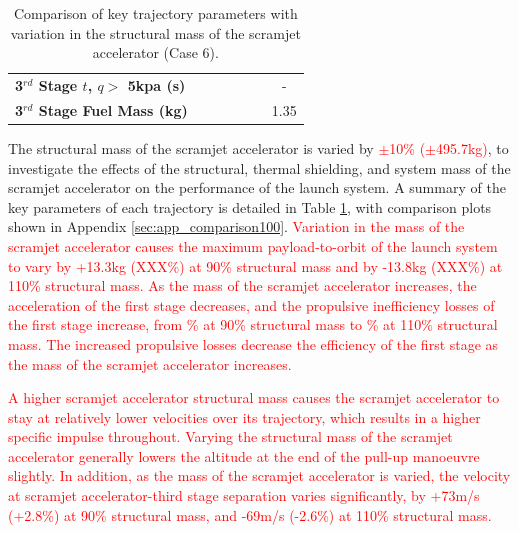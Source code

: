 \begin{table}[ht]
\begin{tabular}{l c c c c c c}
		\\
		\textbf{3$^{rd}$ Stage $t$, $q >$ 5kpa (s)}
		& \thirdqOverFivemSPARTANNinetyNoReturn
		& \thirdqOverFivemSPARTANNinetyFiveNoReturn
		& \thirdqOverFivemSPARTANStandardNoReturn
		& \thirdqOverFivemSPARTANOneHundredFiveNoReturn
		& \thirdqOverFivemSPARTANOneHundredTenNoReturn
		& -
		\\
		\textbf{3$^{rd}$ Stage Fuel Mass (kg)}
		& \thirdmFuelmSPARTANNinetyNoReturn
		& \thirdmFuelmSPARTANNinetyFiveNoReturn
		& \thirdmFuelmSPARTANStandardNoReturn
		& \thirdmFuelmSPARTANOneHundredFiveNoReturn
		& \thirdmFuelmSPARTANOneHundredTenNoReturn
		&1.35
		\\
		\hline 
	\end{tabular} 
\caption{Comparison of key trajectory parameters with variation in the structural mass of the scramjet accelerator (Case 6).}
\label{tab:comparison100}
	
\end{table}



The structural mass of the scramjet accelerator is varied by \textcolor{red}{$\pm$10\% ($\pm$495.7kg)}, to investigate the effects of the structural, thermal shielding, and system mass of the scramjet accelerator on the performance of the launch system. A summary of the key parameters of each trajectory is detailed in Table \ref{tab:comparison100}, with comparison plots shown in Appendix \ref{sec:app_comparison100}.
\textcolor{red}{Variation in the mass of the scramjet accelerator causes the maximum payload-to-orbit of the launch system to vary by +13.3kg (XXX\%) at 90\% structural mass and by -13.8kg (XXX\%) at 110\% structural mass. 
 As the mass of the scramjet accelerator increases, the acceleration of the first stage decreases, and the propulsive inefficiency losses of the first stage increase, from \PlossonemSPARTANNinetyNoReturn\% at 90\% structural mass to \PlossonemSPARTANOneHundredTenNoReturn\% at 110\% structural mass. The increased propulsive losses decrease the efficiency of the first stage as the mass of the scramjet accelerator increases.}

\textcolor{red}{
A higher scramjet accelerator structural mass causes the scramjet accelerator to stay at relatively lower velocities over its trajectory, which results in a higher specific impulse throughout. 
Varying the structural mass of the scramjet accelerator generally lowers the altitude at the end of the pull-up manoeuvre slightly. In addition, as the mass of the scramjet accelerator is varied, the velocity at scramjet accelerator-third stage separation varies significantly, by +73m/s (+2.8\%) at 90\% structural mass, and -69m/s (-2.6\%) at 110\% structural mass. }


